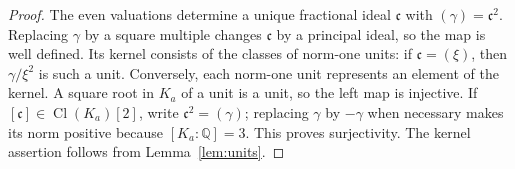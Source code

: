 \documentclass[11pt,leqno,oneside,letterpaper]{amsart}
\theoremstyle{remark}
\numberwithin{equation}{section}
\newcommand{\Q}{\mathbb Q}
\DeclareMathOperator{\Cl}{Cl}
\begin{document}
\begin{proof}
  The even valuations determine a unique fractional ideal $\mathfrak c$ with $(\gamma)=\mathfrak c^2$. Replacing $\gamma$ by a square multiple changes $\mathfrak c$ by a principal ideal, so the map is well defined. Its kernel consists of the classes of norm-one units: if $\mathfrak c=(\xi)$, then $\gamma/\xi^2$ is such a unit. Conversely, each norm-one unit represents an element of the kernel. A square root in ${K_{a}}$ of a unit is a unit, so the left map is injective. If $[\mathfrak c]\in\Cl({K_{a}})[2]$, write $\mathfrak c^2=(\gamma)$; replacing $\gamma$ by $-\gamma$ when necessary makes its norm positive because $[{K_{a}}:\Q]=3$. This proves surjectivity. The kernel assertion follows from Lemma~\ref{lem:units}.
\end{proof}
\end{document}
